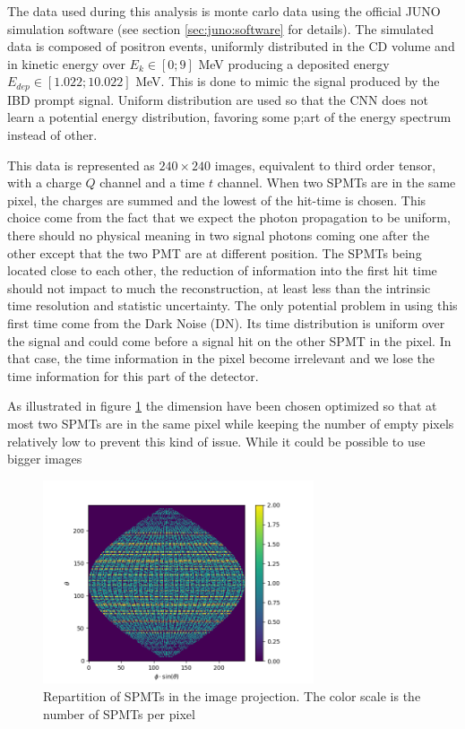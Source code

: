 The data used during this analysis is monte carlo data using the official JUNO simulation software (see section \ref{sec:juno:software} for details). The simulated data is composed of positron events, uniformly distributed in the CD volume and in kinetic energy over $E_k \in [0; 9]$ MeV producing a deposited energy $E_{dep} \in [1.022; 10.022]$ MeV. This is done to mimic the signal produced by the IBD prompt signal. Uniform distribution are used so that the CNN does not learn a potential energy distribution, favoring some p;art of the energy spectrum instead of other.

This data is represented as $240 \times 240$ images, equivalent to third order tensor, with a charge $Q$ channel and a time $t$ channel. When two SPMTs are in the same pixel, the charges are summed and the lowest of the hit-time is chosen. This choice come from the fact that we expect the photon propagation to be uniform, there should no physical meaning in two signal photons coming one after the other except that the two PMT are at different position. The SPMTs being located close to each other, the reduction of information into the first hit time should not impact to much the reconstruction, at least less than the intrinsic time resolution and statistic uncertainty. The only potential problem in using this first time come from the Dark Noise (DN). Its time distribution is uniform over the signal and could come before a signal hit on the other SPMT in the pixel. In that case, the time information in the pixel become irrelevant and we lose the time information for this part of the detector.

As illustrated in figure \ref{fig:jcnn:pmt_rep} the dimension have been chosen optimized so that at most two SPMTs are in the same pixel while keeping the number of empty pixels relatively low to prevent this kind of issue. While it could be possible to use bigger images 


\begin{figure}[ht]
  \centering
  \includegraphics[height=6cm]{images/jcnn/pmt_repartition.png}
  \caption{Repartition of SPMTs in the image projection. The color scale is the number of SPMTs per pixel}
  \label{fig:jcnn:pmt_rep}
\end{figure}

